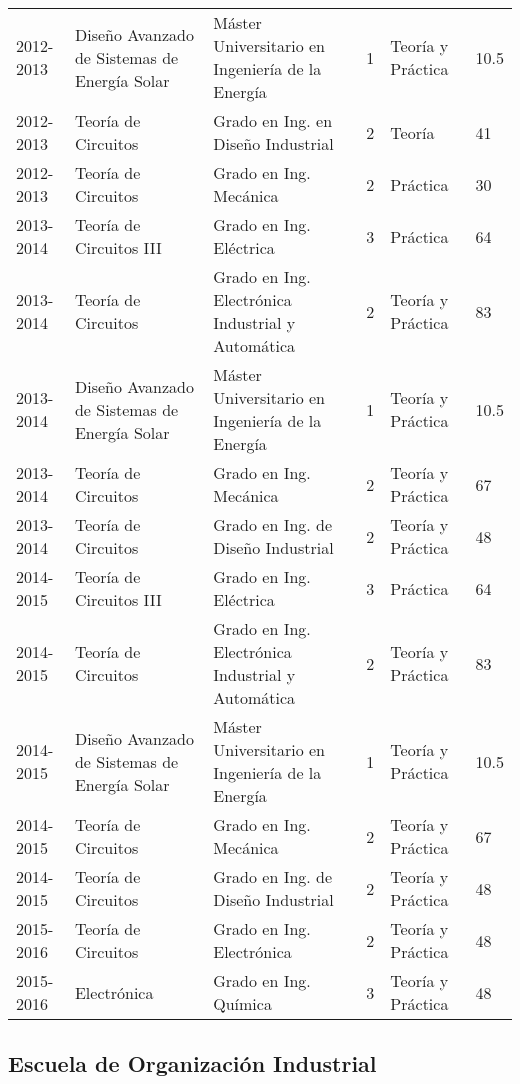 \documentclass[article, a4paper]{memoir}
\begin{document}
\begin{center}
\begin{tabular}{p{18mm}p{45mm}p{40mm}p{10mm}p{15mm}p{10mm}}
2012-2013 & Diseño Avanzado de Sistemas de Energía Solar & Máster Universitario en Ingeniería de la Energía & 1 & Teoría y Práctica & 10.5\\
2012-2013 & Teoría de Circuitos & Grado en Ing. en Diseño Industrial & 2 & Teoría & 41\\
2012-2013 & Teoría de Circuitos & Grado en Ing. Mecánica & 2 & Práctica & 30\\
\hline
2013-2014 & Teoría de Circuitos III & Grado en Ing. Eléctrica & 3 & Práctica & 64\\
2013-2014 & Teoría de Circuitos & Grado en Ing. Electrónica Industrial y Automática & 2 & Teoría y Práctica & 83\\
2013-2014 & Diseño Avanzado de Sistemas de Energía Solar & Máster Universitario en Ingeniería de la Energía & 1 & Teoría y Práctica & 10.5\\
2013-2014 & Teoría de Circuitos & Grado en Ing. Mecánica & 2 & Teoría y Práctica & 67\\
2013-2014 & Teoría de Circuitos & Grado en Ing. de Diseño Industrial & 2 & Teoría y Práctica & 48\\
\hline
2014-2015 & Teoría de Circuitos III & Grado en Ing. Eléctrica & 3 & Práctica & 64\\
2014-2015 & Teoría de Circuitos & Grado en Ing. Electrónica Industrial y Automática & 2 & Teoría y Práctica & 83\\
2014-2015 & Diseño Avanzado de Sistemas de Energía Solar & Máster Universitario en Ingeniería de la Energía & 1 & Teoría y Práctica & 10.5\\
2014-2015 & Teoría de Circuitos & Grado en Ing. Mecánica & 2 & Teoría y Práctica & 67\\
2014-2015 & Teoría de Circuitos & Grado en Ing. de Diseño Industrial & 2 & Teoría y Práctica & 48\\
\hline
2015-2016 & Teoría de Circuitos & Grado en Ing. Electrónica & 2 & Teoría y Práctica & 48\\
2015-2016 & Electrónica & Grado en Ing. Química & 3 & Teoría y Práctica & 48\\
\hline
\end{tabular}
\end{center}





\subsection{Escuela de Organización Industrial}
\label{sec-4-2}
\end{document}

